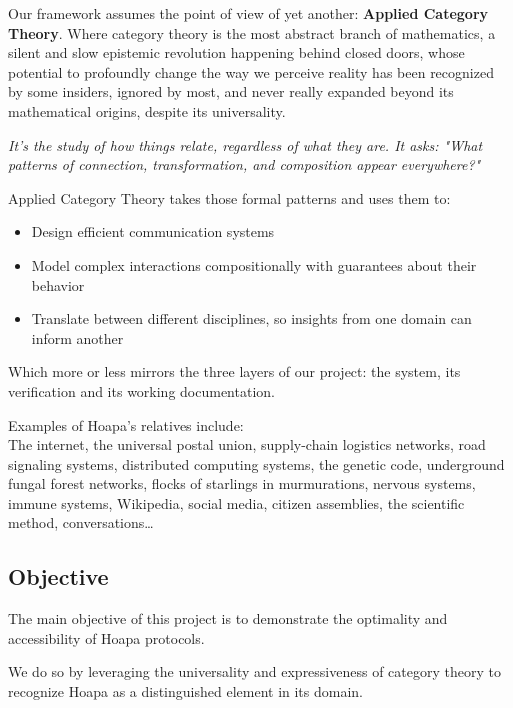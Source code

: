 \documentclass[11pt]{article}
\begin{document}
Our framework assumes the point of view of yet another: \textbf{Applied Category Theory}. Where category theory is the most abstract branch of mathematics, a silent and slow epistemic revolution happening behind closed doors, whose potential to profoundly change the way we perceive reality has been recognized by some insiders, ignored by most, and never really expanded beyond its mathematical origins, despite its universality.

\emph{It's the study of how things relate, regardless of what they are. It asks: "What patterns of connection, transformation, and composition appear everywhere?"}

Applied Category Theory takes those formal patterns and uses them to:

\begin{itemize}

\item Design efficient communication systems

\item Model complex interactions compositionally with guarantees about their behavior

\item Translate between different disciplines, so insights from one domain can inform another

\end{itemize}

Which more or less mirrors the three layers of our project: the system, its verification and its working documentation.

Examples of Hoapa's relatives include: \\ The internet, the universal postal union, supply-chain logistics networks, road signaling systems, distributed computing systems, the genetic code, underground fungal forest networks, flocks of starlings in murmurations, nervous systems, immune systems, Wikipedia, social media, citizen assemblies, the scientific method, conversations\ldots{}

\subsection{Objective}

The main objective of this project is to demonstrate the optimality and accessibility of Hoapa protocols.

We do so by leveraging the universality and expressiveness of category theory to recognize Hoapa as a distinguished element in its domain.
\end{document}
